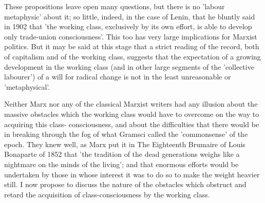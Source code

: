 These propositions leave open many questions, but there is no 'labour metaphysic' about it; so little, indeed, in the case of Lenin, that he bluntly said in 1902 that 'the working class, exclusively by its own effort, is able to develop only trade-union consciousness'. This too has very large implications for Marxist politics. But it may be said at this stage that a strict reading of the record, both of capitalism and of the working class, suggests that the expectation of a growing development in the working class (and in other large segments of the 'collective labourer') of a will for radical change is not in the least unreasonable or 'metaphysical'.

Neither Marx nor any of the classical Marxist writers had any illusion about the massive obstacles which the working class would have to overcome on the way to acquiring this class- consciousness, and about the difficulties that there would be in breaking through the fog of what Gramsci called the 'commonsense' of the epoch. They knew well, as Marx put it in The Eighteenth Brumaire of Louis Bonaparte of 1852 that 'the tradition of the dead generations weighs like a nightmare on the minds of the living'; and that enormous efforts would be undertaken by those in whose interest it was to do so to make the weight heavier still. I now propose to discuss the nature of the obstacles which obstruct and retard the acquisition of class\hyp{}consciousness by the working class.

